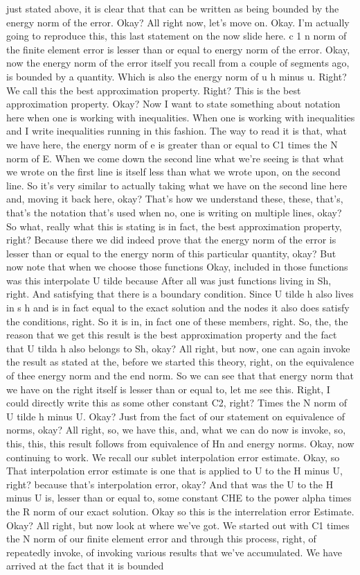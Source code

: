 \documentclass[10pt]{article}
\begin{document}
{just stated above, it is clear that that can be written as being bounded by the energy norm of the error. Okay? All right now, let's move on. Okay. I'm actually going to reproduce this, this last statement on the now slide here. c 1 n norm of the finite element error is lesser than or equal to energy norm of the error. Okay, now the energy norm of the error itself you recall from a couple of segments ago, is bounded by a quantity. Which is also the energy norm of u h minus u. Right? We call this the best approximation property. Right? This is the best approximation property. Okay? Now I want to state something about notation here when one is working with inequalities. When one is working with inequalities and I write inequalities running in this fashion. The way to read it is that, what we have here, the energy norm of e is greater than or equal to C1 times the N norm of E. When we come down the second line what we're seeing is that what we wrote on the first line is itself less than what we wrote upon, on the second line. So it's very similar to actually taking what we have on the second line here and, moving it back here, okay? That's how we understand these, these, that's, that's the notation that's used when no, one is writing on multiple lines, okay? So what, really what this is stating is in fact, the best approximation property, right? Because there we did indeed prove that the energy norm of the error is lesser than or equal to the energy norm of this particular quantity, okay? But now note that when we choose those functions Okay, included in those functions was this interpolate U tilde because After all was just functions living in Sh, right. And satisfying that there is a boundary condition. Since U tilde h also lives in s h and is in fact equal to the exact solution and the nodes it also does satisfy the conditions, right. So it is in, in fact one of these members, right. So, the, the reason that we get this result is the best approximation property and the fact that U tilda h also belongs to Sh, okay? All right, but now, one can again invoke the result as stated at the, before we started this theory, right, on the equivalence of thee energy norm and the end norm. So we can see that that energy norm that we have on the right itself is lesser than or equal to, let me see this. Right, I could directly write this as some other constant C2, right? Times the N norm of U tilde h minus U. Okay? Just from the fact of our statement on equivalence of norms, okay? All right, so, we have this, and, what we can do now is invoke, so, this, this, this result follows from equivalence of Hn and energy norms. Okay, now continuing to work. We recall our sublet interpolation error estimate. Okay, so That interpolation error estimate is one that is applied to U to the H minus U, right? because that's interpolation error, okay? And that was the U to the H minus U is, lesser than or equal to, some constant CHE to the power alpha times the R norm of our exact solution. Okay so this is the interrelation error Estimate. Okay? All right, but now look at where we've got. We started out with C1 times the N norm of our finite element error and through this process, right, of repeatedly invoke, of invoking various results that we've accumulated. We have arrived at the fact that it is bounded }
\end{document}
